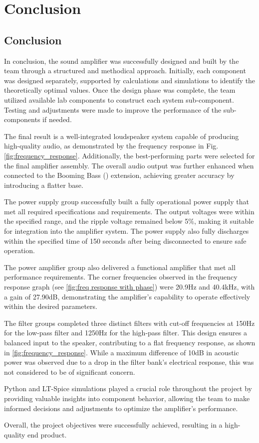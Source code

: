\chapter{Conclusion}
\label{chapter:conclusion}
\section{Conclusion}
In conclusion, the sound amplifier was successfully designed and built by the team through a structured and methodical approach. Initially, each component was designed separately, supported by calculations and simulations to identify the theoretically optimal values. Once the design phase was complete, the team utilized available lab components to construct each system sub-component. Testing and adjustments were made to improve the performance of the sub-components if needed.

The final result is a well-integrated loudspeaker system capable of producing high-quality audio, as demonstrated by the frequency response in Fig. \ref{fig:frequency_response}. Additionally, the best-performing parts were selected for the final amplifier assembly. The overall audio output was further enhanced when connected to the Booming Bass (\cite{Linkwitz}) extension, achieving greater accuracy by introducing a flatter base.

The power supply group successfully built a fully operational power supply that met all required specifications and requirements. The output voltages were within the specified range, and the ripple voltage remained below 5\%, making it suitable for integration into the amplifier system. The power supply also fully discharges within the specified time of 150 seconds after being disconnected to ensure safe operation.

The power amplifier group also delivered a functional amplifier that met all performance requirements. The corner frequencies observed in the frequency response graph (see \autoref{fig:freq response with phase}) were 20.9Hz and 40.4kHz, with a gain of 27.90dB, demonstrating the amplifier's capability to operate effectively within the desired parameters.

The filter groups completed three distinct filters with cut-off frequencies at 150Hz for the low-pass filter and 1250Hz for the high-pass filter. This design ensures a balanced input to the speaker, contributing to a flat frequency response, as shown in \autoref{fig:frequency_response}. While a maximum difference of 10dB in acoustic power was observed due to a drop in the filter bank's electrical response, this was not considered to be of significant concern.

Python and LT-Spice simulations played a crucial role throughout the project by providing valuable insights into component behavior, allowing the team to make informed decisions and adjustments to optimize the amplifier's performance.

Overall, the project objectives were successfully achieved, resulting in a high-quality end product.
